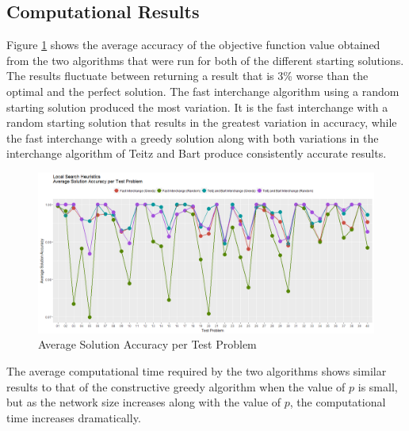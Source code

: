 \documentclass[11pt]{article}
\begin{document}
	\subsection{Computational Results} \label{classicheuristics.localsearch.results}
	Figure \ref{LS.av.acc} shows the average accuracy of the objective function value obtained from the two algorithms that were run for both of the different starting solutions.  The results fluctuate between returning a result that is 3\% worse than the optimal and the perfect solution.  The fast interchange algorithm using a random starting solution produced the most variation.  It is the fast interchange with a random starting solution that results in the greatest variation in accuracy, while the fast interchange with a greedy solution along with both variations in the interchange algorithm of Teitz and Bart produce consistently accurate results.
	
	\begin{figure}[H]
		\begin{center}
			\includegraphics[width=14cm]{LSavacc.png}
			\caption{Average Solution Accuracy per Test Problem}
			\label{LS.av.acc}
		\end{center}
	\end{figure}

	The average computational time required by the two algorithms shows similar results to that of the constructive greedy algorithm when the value of $p$ is small, but as the network size increases along with the value of $p$, the computational time increases dramatically.
\end{document}
